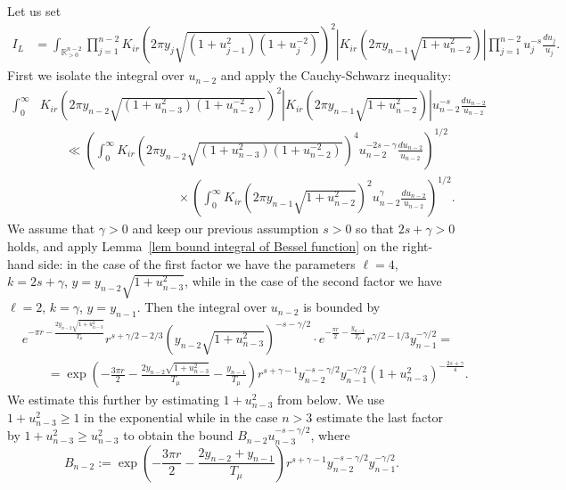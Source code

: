\documentclass[11pt, oneside]{amsart}
\theoremstyle{plain}
\theoremstyle{remark}
\newcommand{\R}{\mathbb{R}}
\newcommand{\abs}[1]{\left|#1\right|}
\begin{document}
Let us set 
\begin{align*}
I_L&=\int_{\R_{>0}^{n-2}}\prod_{j=1}^{n-2}
K_{ir}\left(2\pi y_j\sqrt{(1+u_{j-1}^2)(1+u_j^{-2})}\right)^2
\abs{K_{ir}\left(2\pi y_{n-1}\sqrt{1+u_{n-2}^2}\right)}
\prod_{j=1}^{n-2}u_j^{-s}\frac{du_j}{u_j}.
\end{align*}
First we isolate the integral over $u_{n-2}$ and apply the Cauchy-Schwarz inequality:
\begin{align*}
\int_0^\infty&K_{ir}\left(2\pi y_{n-2}\sqrt{(1+u_{n-3}^2)(1+u_{n-2}^{-2})}\right)^2\abs{K_{ir}\left(2\pi y_{n-1}\sqrt{1+u_{n-2}^2}\right)}u_{n-2}^{-s}\frac{du_{n-2}}{u_{n-2}}\\
    &\qquad\ll\left(\int_0^\infty 
        K_{ir}\left(2\pi y_{n-2}\sqrt{(1+u_{n-3}^2)(1+u_{n-2}^{-2})}\right)^4
        u_{n-2}^{-2s-\gamma}\frac{du_{n-2}}{u_{n-2}}\right)^{1/2}\\
    &\qquad\qquad\qquad\qquad\qquad\quad \times
    \left(\int_0^\infty K_{ir}\left(2\pi y_{n-1}\sqrt{1+u_{n-2}^2}\right)^2u_{n-2}^\gamma\frac{du_{n-2}}{u_{n-2}}\right)^{1/2}.
\end{align*}
We assume  that $\gamma>0$  and keep our previous assumption $s>0$ so that $2s+\gamma>0$ holds,
and apply
 Lemma~\ref{lem bound integral of Bessel function} on the right-hand side:
 in the case of the first factor we have the parameters $\ell =4$, $k=2s+\gamma$,
 $y=y_{n-2}\sqrt{1+u_{n-3}^2}$, while
 in the case of the second factor we have
 $\ell =2$, $k=\gamma$,
 $y=y_{n-1}$.
 Then the integral over $u_{n-2}$ is bounded by
\begin{align*}
&e^{-\pi r -\frac{2y_{n-2}\sqrt{1+u_{n-3}^2}}{T_\mu}}
    r^{s+\gamma/2-2/3}\left(y_{n-2}\sqrt{1+u_{n-3}^2}\right)^{-s-\gamma/2}
\cdot e^{-\frac{\pi r}{2} -\frac{y_{n-1}}{T_\mu}}
    r^{\gamma/2-1/3}y_{n-1}^{-\gamma/2}=\\[3mm]
    &\qquad 
    = \exp\left(-\frac{3\pi r}{2}-\frac{2y_{n-2}\sqrt{1+u_{n-3}^2}}{T_\mu}-\frac{y_{n-1}}{T_\mu}\right)
    r^{s+\gamma-1}y_{n-2}^{-s-\gamma/2}y_{n-1}^{-\gamma/2}
    (1+u_{n-3}^2)^{-\frac{2s+\gamma}{4}}.
\end{align*}
We estimate this further by estimating $1+u_{n-3}^2$ from below. 
We use  $1+u_{n-3}^2\geq 1$ in the exponential while
in the case $n>3$  estimate the last factor  by $1+u_{n-3}^2\geq u_{n-3}^2$
to obtain the bound $B_{n-2}u_{n-3}^{-s-\gamma/2}$, where
\begin{equation}\label{eq:B_n-2}
B_{n-2}:= \exp\left(-\frac{3\pi r}{2}-\frac{2y_{n-2}+y_{n-1}}{T_\mu}\right)
    r^{s+\gamma-1}y_{n-2}^{-s-\gamma/2}y_{n-1}^{-\gamma/2}.
    \end{equation}
\end{document}
